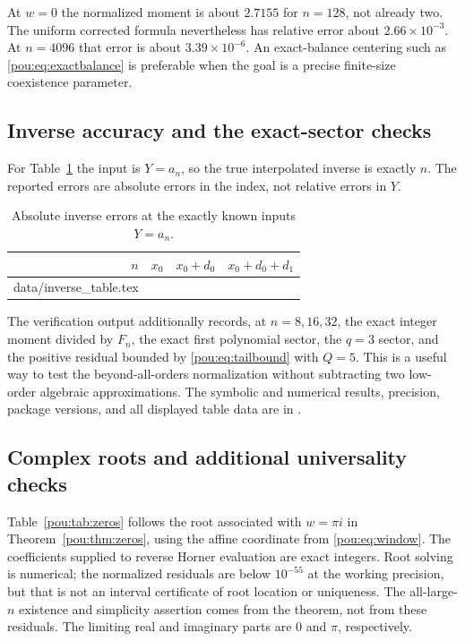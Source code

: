 \documentclass[11pt]{article}
\makeatletter
\theoremstyle{definition}
\theoremstyle{remark}
\newcommand{\tableinput}[1]{\@@input #1 }
\makeatother
\begin{document}
At $w=0$ the normalized moment is about $2.7155$ for $n=128$, not already
two.  The uniform corrected formula nevertheless has relative error about
$2.66\times10^{-3}$.  At $n=4096$ that error is about
$3.39\times10^{-6}$.  An exact-balance centering such as
\eqref{pou:eq:exactbalance} is preferable when the goal is a precise
finite-size coexistence parameter.

\subsection{Inverse accuracy and the exact-sector checks}

For Table~\ref{pou:tab:inverse} the input is $Y=a_n$, so the true interpolated
inverse is exactly $n$.  The reported errors are absolute errors in the
index, not relative errors in $Y$.
\begin{table}[htbp]
\centering
\caption{Absolute inverse errors at the exactly known inputs $Y=a_n$.}
\label{pou:tab:inverse}
\begin{tabular}{rccc}
\toprule
$n$ & $x_0$ & $x_0+d_0$ & $x_0+d_0+d_1$\\
\midrule
\tableinput{data/inverse_table.tex}
\bottomrule
\end{tabular}
\end{table}

The verification output additionally records, at $n=8,16,32$, the exact
integer moment divided by $F_n$, the exact first polynomial sector, the
$q=3$ sector, and the positive residual bounded by
\eqref{pou:eq:tailbound} with $Q=5$.  This is a useful way to test the
beyond-all-orders normalization without subtracting two low-order
algebraic approximations.  The symbolic and numerical results, precision,
package versions, and all displayed table data are in
.

\subsection{Complex roots and additional universality checks}

Table~\ref{pou:tab:zeros} follows the root associated with $w=\pi i$ in
Theorem~\ref{pou:thm:zeros}, using the affine coordinate from
\eqref{pou:eq:window}.  The coefficients supplied to reverse Horner evaluation
are exact integers.  Root solving is numerical; the normalized residuals
are below $10^{-55}$ at the working precision, but that is not an interval
certificate of root location or uniqueness.  The all-large-$n$ existence
and simplicity assertion comes from the theorem, not from these residuals.
The limiting real and imaginary parts are $0$ and $\pi$, respectively.
\end{document}
